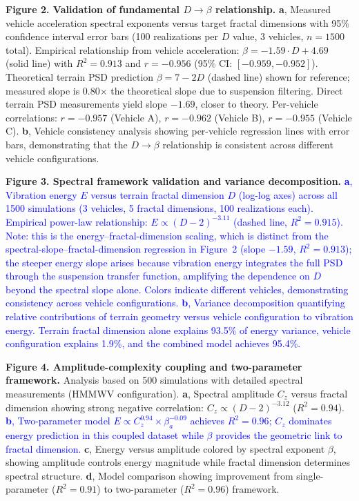 \documentclass[11pt]{article}
\begin{document}
\textbf{Figure 2. Validation of fundamental $D \rightarrow \beta$ relationship.} 
\textbf{a}, Measured vehicle acceleration spectral exponents versus target fractal dimensions with 95\% confidence interval error bars (100 realizations per $D$ value, 3 vehicles, $n=1500$ total). Empirical relationship from vehicle acceleration: $\beta = -1.59 \cdot D + 4.69$ (solid line) with $R^2 = 0.913$ and $r = -0.956$ (95\% CI: $[-0.959, -0.952]$). Theoretical terrain PSD prediction $\beta = 7-2D$ (dashed line) shown for reference; measured slope is 0.80$\times$ the theoretical slope due to suspension filtering. Direct terrain PSD measurements yield slope $-1.69$, closer to theory. Per-vehicle correlations: $r = -0.957$ (Vehicle A), $r = -0.962$ (Vehicle B), $r = -0.955$ (Vehicle C).
\textbf{b}, Vehicle consistency analysis showing per-vehicle regression lines with error bars, demonstrating that the $D \rightarrow \beta$ relationship is consistent across different vehicle configurations.

\textbf{Figure 3. Spectral framework validation and variance decomposition.}
\textcolor{blue}{\textbf{a}, Vibration energy $E$ versus terrain fractal dimension $D$ (log-log axes) across all 1500 simulations (3 vehicles, 5 fractal dimensions, 100 realizations each). Empirical power-law relationship: $E \propto (D-2)^{-3.11}$ (dashed line, $R^2 = 0.915$). Note: this is the energy--fractal-dimension scaling, which is distinct from the spectral-slope--fractal-dimension regression in Figure~2 (slope $-1.59$, $R^2 = 0.913$); the steeper energy slope arises because vibration energy integrates the full PSD through the suspension transfer function, amplifying the dependence on $D$ beyond the spectral slope alone. Colors indicate different vehicles, demonstrating consistency across vehicle configurations.}
\textcolor{blue}{\textbf{b}, Variance decomposition quantifying relative contributions of terrain geometry versus vehicle configuration to vibration energy. Terrain fractal dimension alone explains 93.5\% of energy variance, vehicle configuration explains 1.9\%, and the combined model achieves 95.4\%.}

\textbf{Figure 4. Amplitude-complexity coupling and two-parameter framework.} 
Analysis based on 500 simulations with detailed spectral measurements (HMMWV configuration). 
\textbf{a}, Spectral amplitude $C_z$ versus fractal dimension showing strong negative correlation: $C_z \propto (D-2)^{-3.12}$ ($R^2 = 0.94$). 
\textcolor{blue}{\textbf{b}, Two-parameter model $E \propto C_z^{0.94} \times \beta_a^{-0.09}$ achieves $R^2 = 0.96$; $C_z$ dominates energy prediction in this coupled dataset while $\beta$ provides the geometric link to fractal dimension.} 
\textbf{c}, Energy versus amplitude colored by spectral exponent $\beta$, showing amplitude controls energy magnitude while fractal dimension determines spectral structure. 
\textbf{d}, Model comparison showing improvement from single-parameter ($R^2 = 0.91$) to two-parameter ($R^2 = 0.96$) framework.
\end{document}
